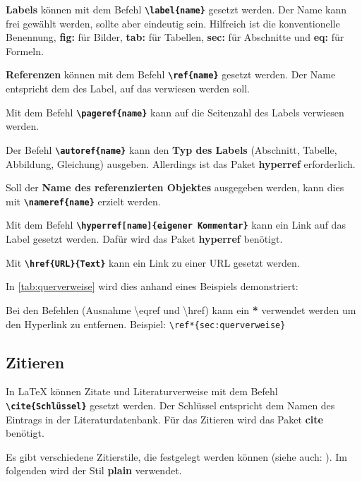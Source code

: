 \textbf{Labels} können mit dem Befehl \textbf{\texttt{\textbackslash label\{name\}}} gesetzt werden. Der Name kann frei gewählt werden, sollte aber eindeutig sein. Hilfreich ist die konventionelle Benennung, \textbf{fig:} für Bilder, \textbf{tab:} für Tabellen, \textbf{sec:} für Abschnitte und \textbf{eq:} für Formeln.

\textbf{Referenzen} können mit dem Befehl \textbf{\texttt{\textbackslash ref\{name\}}} gesetzt werden. Der Name entspricht dem des Label, auf das verwiesen werden soll.

Mit dem Befehl \textbf{\texttt{\textbackslash pageref\{name\}}} kann auf die Seitenzahl des Labels verwiesen werden.

Der Befehl \textbf{\texttt{\textbackslash autoref\{name\}}} kann den \textbf{Typ des Labels} (Abschnitt, Tabelle, Abbildung, Gleichung) ausgeben. Allerdings ist das Paket \textbf{hyperref} erforderlich.

Soll der \textbf{Name des referenzierten Objektes} ausgegeben werden, kann dies mit \textbf{\texttt{\textbackslash nameref\{name\}}} erzielt werden.

Mit dem Befehl \textbf{\texttt{\textbackslash hyperref[name]\{eigener Kommentar\}}} kann ein Link auf das Label gesetzt werden. Dafür wird das Paket \textbf{hyperref} benötigt.

Mit \textbf{\texttt{\textbackslash href\{URL\}\{Text\}}} kann ein Link zu einer URL gesetzt werden.

In \autoref{tab:querverweise} wird dies anhand eines Beispiels demonstriert:


Bei den Befehlen (Ausnahme \textbackslash eqref und \textbackslash href) kann ein \textbf{*} verwendet werden um den Hyperlink zu entfernen. Beispiel: \texttt{\textbackslash ref*\{sec:querverweise\}}


\subsection{Zitieren}
\label{sec:zitieren}
In \LaTeX{} können Zitate und Literaturverweise mit dem Befehl \textbf{\texttt{\textbackslash cite\{Schlüssel\}}} gesetzt werden. Der Schlüssel entspricht dem Namen des Eintrags in der Literaturdatenbank.
Für das Zitieren wird das Paket \textbf{cite} benötigt.

Es gibt verschiedene Zitierstile, die festgelegt werden können (siehe auch: ). Im folgenden wird der Stil \textbf{plain} verwendet.

